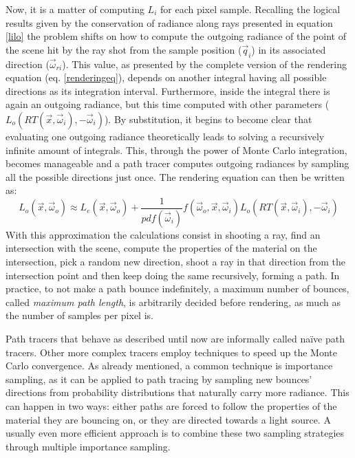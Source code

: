 Now, it is a matter of computing $L_i$ for each pixel sample. Recalling the logical results given by the conservation of radiance along rays presented in equation \ref{lilo} the problem shifts on how to compute the outgoing radiance of the point of the scene hit by the ray shot from the sample position ($\vec{q}_i$) in its associated direction ($\vec{\omega}_{ri}$). This value, as presented by the complete version of the rendering equation (eq. \ref{renderingeq}), depends on another integral having all possible directions as its integration interval. Furthermore, inside the integral there is again an outgoing radiance, but this time computed with other parameters ($L_o(RT(\vec{x},\vec{\omega}_i),-\vec{\omega}_i)$). By substitution, it begins to become clear that evaluating one outgoing radiance theoretically leads to solving a recursively infinite amount of integrals. This, through the power of Monte Carlo integration, becomes manageable and a path tracer computes outgoing radiances by sampling all the possible directions just once. The rendering equation can then be written as:
\begin{equation}
	L_o(\vec{x},\vec{\omega}_o) \approx
	L_e(\vec{x},\vec{\omega}_o) + 
	\frac{1}{pdf(\vec{\omega}_i)}
	f(\vec{\omega}_o, \vec{x}, \vec{\omega}_i)
	L_o(RT(\vec{x},\vec{\omega}_i),-\vec{\omega}_i)	
\end{equation}
With this approximation the calculations consist in shooting a ray, find an intersection with the scene, compute the properties of the material on the intersection, pick a random new direction, shoot a ray in that direction from the intersection point and then keep doing the same recursively, forming a path. In practice, to not make a path bounce indefinitely, a maximum number of bounces, called \textit{maximum path length}, is arbitrarily decided before rendering, as much as the number of samples per pixel is.

Path tracers that behave as described until now are informally called na\"ive path tracers. Other more complex tracers employ techniques to speed up the Monte Carlo convergence. As already mentioned, a common technique is importance sampling, as it can be applied to path tracing by sampling new bounces' directions from probability distributions that naturally carry more radiance. This can happen in two ways: either paths are forced to follow the properties of the material they are bouncing on, or they are directed towards a light source. A usually even more efficient approach is to combine these two sampling strategies through multiple importance sampling.

